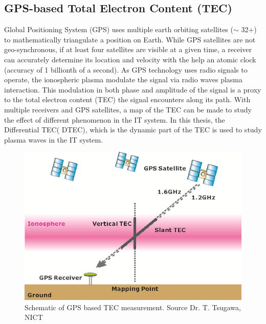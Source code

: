 \documentclass[crop=false,class=mitthesis,oneside,font=12pt]{standalone}
\begin{document}
\subsection{GPS-based Total Electron Content (TEC)}
Global Positioning System (GPS) uses multiple earth orbiting satellites ($\sim$ 32+) to mathematically triangulate a position on Earth. While GPS satellites are not geo-synchronous, if at least four satellites are visible at a given time, a receiver can accurately determine its location and velocity with the help an atomic clock (accuracy of 1 billionth of a second). As GPS technology uses radio signals to operate, the ionospheric plasma modulate the signal via radio waves plasma interaction. This modulation in both phase and amplitude of the signal is a proxy to the total electron content (TEC) the signal encounters along its path. With multiple receivers and GPS satellites, a map of the TEC can be made to study the effect of different phenomenon in the IT system. In this thesis, the Differential TEC( DTEC), which is the dynamic part of the TEC is used to study plasma waves in the IT system.
\begin{figure}[H]
	\centering\includegraphics[width=30pc]{6-0.png}
	\caption{Schematic of GPS based TEC measurement. Source Dr. T. Tsugawa, NICT}
	\label{fig:gps}
\end{figure}
\end{document}
